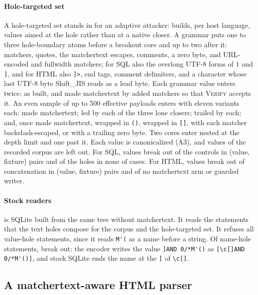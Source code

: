 \paragraph{Hole-targeted set}
A hole-targeted set stands in for an adaptive attacker:
 builds, per host language, values aimed at the
hole rather than at a native closer. A grammar puts one to three hole-boundary
atoms before a breakout core and up to two after it: matchers, quotes, the
matchertext escapes, comments, a zero byte, and URL-encoded and fullwidth
matchers; for SQL also the overlong UTF-8 forms of \verb|)| and \verb|]|, and
for HTML also \verb|]>|, end tags, comment delimiters, and a character whose
last UTF-8 byte Shift\_JIS reads as a lead byte. Each grammar value enters twice:
as built, and made matchertext by added matchers so that \textsc{Verify} accepts it. An
even sample of up to 500 effective payloads enters with eleven variants each:
made matchertext; led by each of the three lone closers; trailed by each; and,
once made matchertext, wrapped in \verb|()|, wrapped in \verb|[]|, with each
matcher backslash-escaped, or with a trailing zero byte. Two cores enter nested at the depth limit and one past it.
Each value is canonicalized (A3), and values of the recorded corpus are left
out. For SQL, \dataSqliTargetedValues values break out of the controls in
\dataSqliTargetedEffective (value, fixture) pairs and of the holes in none of
\dataSqliTargetedHoleCases cases. For HTML, \dataHtmlTargetedValues values break
out of concatenation in \dataHtmlTargetedEffective (value, fixture) pairs and of no
matchertext arm or guarded writer.

\paragraph{Stock readers}
 is SQLite built from the same tree
without matchertext. It reads the statements that the text holes compose for the
corpus and the hole-targeted set. It refuses all \dataSqliDowngradeValueCases
value-hole statements, since it reads \verb|M'(| as a name before a string. Of
\dataSqliDowngradeNameCases name-hole statements, \dataSqliDowngradeNameBreakout
break out: the encoder writes the value \verb|]AND 0/*M'()| as
\verb|[\c[]AND 0/*M'()]|, and stock SQLite ends the name at the \verb|]| of
\verb|\c[]|.

\subsection{A matchertext-aware HTML parser}
\label{sec:prevent:html}

